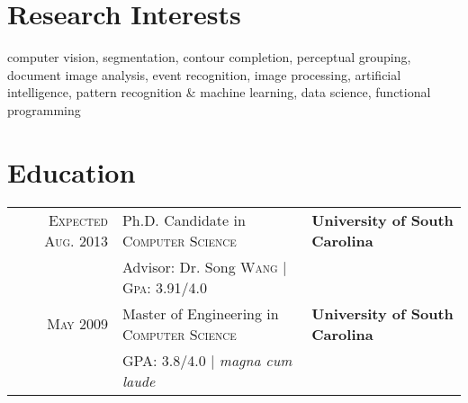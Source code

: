 \documentclass[10pt]{article}
\begin{document}
\section{Research Interests}

computer vision, segmentation, contour completion, perceptual
grouping, document image analysis, event recognition, image
processing, artificial intelligence, pattern recognition \& machine
learning, data science, functional programming

\section{Education}
\begin{tabularx}{\linewidth}{@{}r l X}
  \textsc{Expected Aug. 2013} & Ph.D. Candidate in \textsc{Computer Science} & \textbf{University of South Carolina}\\
  &%
  \small Advisor: Dr. Song \textsc{Wang} | \normalsize \textsc{Gpa}: 3.91/4.0 &
  \\ [1ex]%
  \textsc{May} 2009 & Master of Engineering in \textsc{Computer Science} & \textbf{University of South Carolina}\\
  &\normalsize \textsc{GPA}: 3.8/4.0 | \small\emph{magna cum laude}
\\[1ex]%
\end{tabularx}
\end{document}
